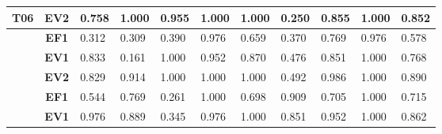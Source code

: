 \begin{table}[htbp]
\begin{tabular}{|cclllllllll|}
		\multicolumn{1}{|c|}{\multirow{-3}{*}{\cellcolor[HTML]{F2F2F2}\textbf{T06}}} & \multicolumn{1}{c|}{\textbf{EV2}} & \multicolumn{1}{l|}{0.758} & \multicolumn{1}{l|}{1.000} & \multicolumn{1}{l|}{0.955} & \multicolumn{1}{l|}{1.000} & \multicolumn{1}{l|}{1.000} & \multicolumn{1}{l|}{0.250} & \multicolumn{1}{l|}{0.855} & \multicolumn{1}{l|}{1.000} & 0.852 \\ \hline
		\rowcolor[HTML]{F2F2F2} 
		\multicolumn{1}{|c|}{\cellcolor[HTML]{F2F2F2}} & \multicolumn{1}{c|}{\cellcolor[HTML]{F2F2F2}\textbf{EF1}} & \multicolumn{1}{l|}{\cellcolor[HTML]{F2F2F2}0.312} & \multicolumn{1}{l|}{\cellcolor[HTML]{F2F2F2}0.309} & \multicolumn{1}{l|}{\cellcolor[HTML]{F2F2F2}0.390} & \multicolumn{1}{l|}{\cellcolor[HTML]{F2F2F2}0.976} & \multicolumn{1}{l|}{\cellcolor[HTML]{F2F2F2}0.659} & \multicolumn{1}{l|}{\cellcolor[HTML]{F2F2F2}0.370} & \multicolumn{1}{l|}{\cellcolor[HTML]{F2F2F2}0.769} & \multicolumn{1}{l|}{\cellcolor[HTML]{F2F2F2}0.976} & 0.578 \\ \cline{2-11} 
		\multicolumn{1}{|c|}{\cellcolor[HTML]{F2F2F2}} & \multicolumn{1}{c|}{\textbf{EV1}} & \multicolumn{1}{l|}{0.833} & \multicolumn{1}{l|}{0.161} & \multicolumn{1}{l|}{1.000} & \multicolumn{1}{l|}{0.952} & \multicolumn{1}{l|}{0.870} & \multicolumn{1}{l|}{0.476} & \multicolumn{1}{l|}{0.851} & \multicolumn{1}{l|}{1.000} & 0.768 \\ \cline{2-11} 
		\rowcolor[HTML]{F2F2F2} 
		\multicolumn{1}{|c|}{\multirow{-3}{*}{\cellcolor[HTML]{F2F2F2}\textbf{T08}}} & \multicolumn{1}{c|}{\cellcolor[HTML]{F2F2F2}\textbf{EV2}} & \multicolumn{1}{l|}{\cellcolor[HTML]{F2F2F2}0.829} & \multicolumn{1}{l|}{\cellcolor[HTML]{F2F2F2}0.914} & \multicolumn{1}{l|}{\cellcolor[HTML]{F2F2F2}1.000} & \multicolumn{1}{l|}{\cellcolor[HTML]{F2F2F2}1.000} & \multicolumn{1}{l|}{\cellcolor[HTML]{F2F2F2}1.000} & \multicolumn{1}{l|}{\cellcolor[HTML]{F2F2F2}0.492} & \multicolumn{1}{l|}{\cellcolor[HTML]{F2F2F2}0.986} & \multicolumn{1}{l|}{\cellcolor[HTML]{F2F2F2}1.000} & 0.890 \\ \hline
		\multicolumn{1}{|c|}{\cellcolor[HTML]{F2F2F2}} & \multicolumn{1}{c|}{\textbf{EF1}} & \multicolumn{1}{l|}{0.544} & \multicolumn{1}{l|}{0.769} & \multicolumn{1}{l|}{0.261} & \multicolumn{1}{l|}{1.000} & \multicolumn{1}{l|}{0.698} & \multicolumn{1}{l|}{0.909} & \multicolumn{1}{l|}{0.705} & \multicolumn{1}{l|}{1.000} & 0.715 \\ \cline{2-11} 
		\rowcolor[HTML]{F2F2F2} 
		\multicolumn{1}{|c|}{\cellcolor[HTML]{F2F2F2}} & \multicolumn{1}{c|}{\cellcolor[HTML]{F2F2F2}\textbf{EV1}} & \multicolumn{1}{l|}{\cellcolor[HTML]{F2F2F2}0.976} & \multicolumn{1}{l|}{\cellcolor[HTML]{F2F2F2}0.889} & \multicolumn{1}{l|}{\cellcolor[HTML]{F2F2F2}0.345} & \multicolumn{1}{l|}{\cellcolor[HTML]{F2F2F2}0.976} & \multicolumn{1}{l|}{\cellcolor[HTML]{F2F2F2}1.000} & \multicolumn{1}{l|}{\cellcolor[HTML]{F2F2F2}0.851} & \multicolumn{1}{l|}{\cellcolor[HTML]{F2F2F2}0.952} & \multicolumn{1}{l|}{\cellcolor[HTML]{F2F2F2}1.000} & 0.862 \\ \cline{2-11} 

\end{tabular}
\end{table}
